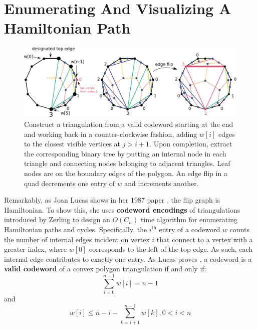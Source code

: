 \documentclass[english]{socg-lipics-v2021}
\begin{document}
\section{Enumerating And Visualizing A Hamiltonian Path}


\begin{figure}
    \centering
    \includegraphics[width=\textwidth]{elevengon.pdf}
    \caption{Construct a triangulation from a valid codeword starting at the end and working back in a counter-clockwise fashion, adding $w[i]$ edges to the closest visible vertices at $j > i+1$.  Upon completion, extract the corresponding binary tree by putting an internal node in each triangle and connecting nodes belonging to adjacent triangles.  Leaf nodes are on the boundary edges of the polygon.  An edge flip in a quad decrements one entry of $w$ and increments another.}
    \label{fig:construct}
\end{figure}

Remarkably, as Joan Lucas shows in her 1987 paper \cite{lucas1987rotation}, the flip graph is Hamiltonian.  To show this, she uses \textbf{codeword encodings} of triangulations introduced by Zerling \cite{zerling1985generating} to design an $O(C_n)$ time algorithm for enumerating Hamiltonian paths and cycles.  Specifically, the $i^{\text{th}}$ entry of a codeword $w$ counts the number of internal edges incident on vertex $i$ that connect to a vertex with a greater index, where $w[0]$ corresponds to the left of the top edge.  As such, each internal edge contributes to exactly one entry.  As Lucas proves \cite{lucas1987rotation}, a codeword is a \textbf{valid codeword} of a convex polygon triangulation if and only if:
\begin{equation}
    \label{eq:valid1}
    \sum_{i=0}^{n-1} w[i] = n-1
\end{equation}
and
\begin{equation}
    \label{eq:valid2}
    w[i] \leq n - i - \sum_{k=i+1}^{n-1} w[k], 0 < i < n
\end{equation}
\end{document}
